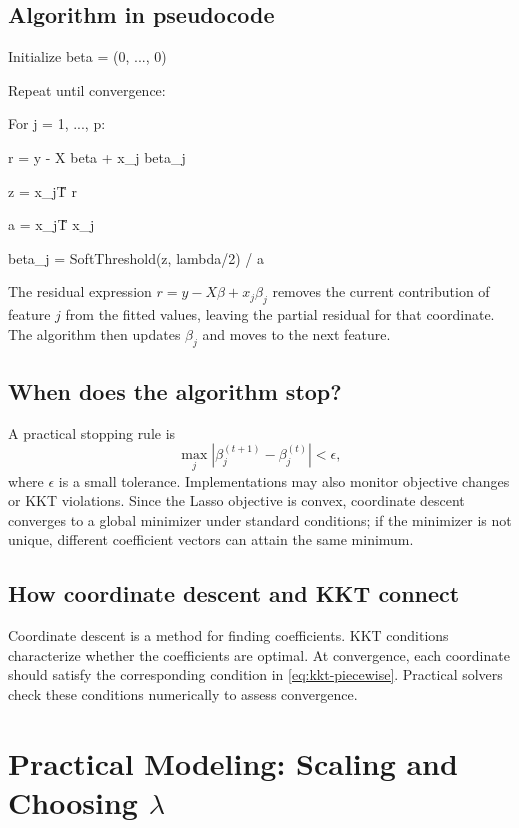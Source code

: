 \documentclass[11pt,a4paper,oneside]{book}
\newcommand{\abs}[1]{\left|#1\right|}
\begin{document}
\section{Algorithm in pseudocode}
\begin{tcolorbox}[colback=black!3,colframe=Muted!70,arc=2mm,boxrule=.5pt]
\ttfamily\small
Initialize beta = (0, ..., 0)\par
Repeat until convergence:\par
\quad For j = 1, ..., p:\par
\qquad r = y - X beta + x\_j beta\_j\par
\qquad z = x\_j\^T r\par
\qquad a = x\_j\^T x\_j\par
\qquad beta\_j = SoftThreshold(z, lambda/2) / a\par
\end{tcolorbox}
The residual expression $r=y-X\beta+x_j\beta_j$ removes the current contribution of feature $j$ from the fitted values, leaving the partial residual for that coordinate. The algorithm then updates $\beta_j$ and moves to the next feature.

\section{When does the algorithm stop?}
A practical stopping rule is
\begin{equation}
  \max_j\abs{\beta_j^{(t+1)}-\beta_j^{(t)}}<\epsilon,
\end{equation}
where $\epsilon$ is a small tolerance. Implementations may also monitor objective changes or KKT violations. Since the Lasso objective is convex, coordinate descent converges to a global minimizer under standard conditions; if the minimizer is not unique, different coefficient vectors can attain the same minimum.

\section{How coordinate descent and KKT connect}
Coordinate descent is a method for finding coefficients. KKT conditions characterize whether the coefficients are optimal. At convergence, each coordinate should satisfy the corresponding condition in \cref{eq:kkt-piecewise}. Practical solvers check these conditions numerically to assess convergence.

\chapter{Practical Modeling: Scaling and Choosing $\lambda$}
\end{document}
